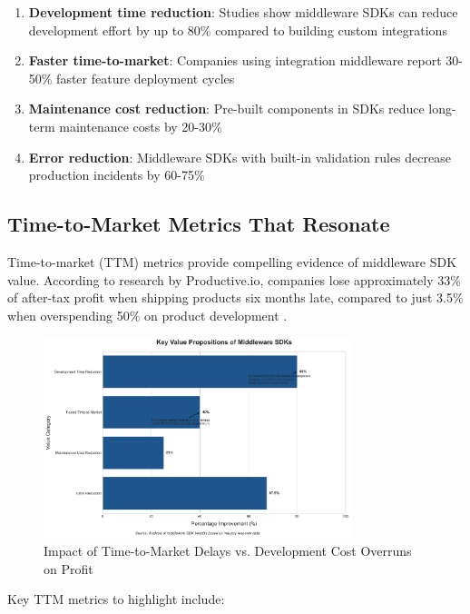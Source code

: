 \documentclass[11pt,a4paper]{article}
\begin{document}
\begin{enumerate}
    \item \textbf{Development time reduction}: Studies show middleware SDKs can reduce development effort by up to 80\% compared to building custom integrations \citep{prismatic2024roi}
    \item \textbf{Faster time-to-market}: Companies using integration middleware report 30-50\% faster feature deployment cycles \citep{nnamu2022aws}
    \item \textbf{Maintenance cost reduction}: Pre-built components in SDKs reduce long-term maintenance costs by 20-30\% \citep{haveignition2024kpis}
    \item \textbf{Error reduction}: Middleware SDKs with built-in validation rules decrease production incidents by 60-75\% \citep{haveignition2024kpis}
\end{enumerate}

\subsection{Time-to-Market Metrics That Resonate}

Time-to-market (TTM) metrics provide compelling evidence of middleware SDK value. According to research by Productive.io, companies lose approximately 33\% of after-tax profit when shipping products six months late, compared to just 3.5\% when overspending 50\% on product development \citep{Jurcic2025}.

\begin{figure}[htbp]
    \centering
    \includegraphics[width=0.8\textwidth]{figures/visualization-20250510123358.png}
    \caption{Impact of Time-to-Market Delays vs. Development Cost Overruns on Profit}
    \label{fig:ttm-impact}
\end{figure}

Key TTM metrics to highlight include:
\end{document}
